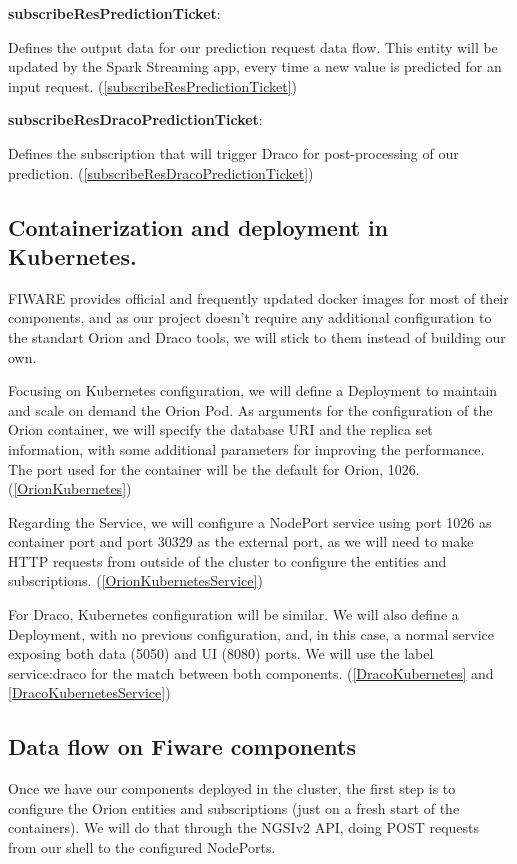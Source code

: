 \textbf{subscribeResPredictionTicket}:

Defines the output data for our prediction request data flow. This entity will be updated by the Spark Streaming app, every time a new value is predicted for an input request. (\ref{subscribeResPredictionTicket})

\textbf{subscribeResDracoPredictionTicket}:

Defines the subscription that will trigger Draco for post-processing of our prediction. (\ref{subscribeResDracoPredictionTicket})


\subsection{Containerization and deployment in Kubernetes.}

FIWARE provides official and frequently updated docker images for most of their components, and as our project doesn't require any additional configuration to the standart Orion and Draco tools, we will stick to them instead of building our own.

Focusing on Kubernetes configuration, we will define a Deployment to maintain and scale on demand the Orion Pod. As arguments for the configuration of the Orion container, we will specify the database URI and the replica set information, with some additional parameters for improving the performance. The port used for the container will be the default for Orion, 1026. (\ref{OrionKubernetes})

Regarding the Service, we will configure a NodePort service using port 1026 as container port and port 30329 as the external port, as we will need to make HTTP requests from outside of the cluster to configure the entities and subscriptions. (\ref{OrionKubernetesService})

For Draco, Kubernetes configuration will be similar. We will also define a Deployment, with no previous configuration, and, in this case, a normal service exposing both data (5050) and UI (8080) ports. We will use the label service:draco for the match between both components. (\ref{DracoKubernetes} and \ref{DracoKubernetesService})

\subsection{Data flow on Fiware components}

Once we have our components deployed in the cluster, the first step is to configure the Orion entities and subscriptions (just on a fresh start of the containers). We will do that through the NGSIv2 API, doing POST requests from our shell to the configured NodePorts.

